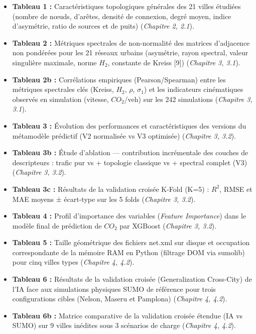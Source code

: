 \documentclass[10pt, a4paper]{article}
\providecommand{\tightlist}{}
\begin{document}
\begin{itemize}
\tightlist
\item
  \textbf{Tableau 1 :} Caractéristiques topologiques générales des 21
  villes étudiées (nombre de nœuds, d'arêtes, densité de connexion,
  degré moyen, indice d'asymétrie, ratio de sources et de puits)
  (\emph{Chapitre 2, 2.1}).
\item
  \textbf{Tableau 2 :} Métriques spectrales de non-normalité des
  matrices d'adjacence non pondérées pour les 21 réseaux urbains
  (asymétrie, rayon spectral, valeur singulière maximale, norme \(H_2\),
  constante de Kreiss {[}9{]}) (\emph{Chapitre 3, 3.1}).
\item
  \textbf{Tableau 2b :} Corrélations empiriques (Pearson/Spearman) entre
  les métriques spectrales clés (Kreiss, \(H_2\), \(\rho\),
  \(\sigma_1\)) et les indicateurs cinématiques observés en simulation
  (vitesse, \(CO_2\)/veh) sur les 242 simulations (\emph{Chapitre 3,
  3.1}).
\item
  \textbf{Tableau 3 :} Évolution des performances et caractéristiques
  des versions du métamodèle prédictif (V2 normalisée vs V3 optimisée)
  (\emph{Chapitre 3, 3.2}).
\item
  \textbf{Tableau 3b :} Étude d'ablation --- contribution incrémentale
  des couches de descripteurs : trafic pur vs + topologie classique vs +
  spectral complet (V3) (\emph{Chapitre 3, 3.2}).
\item
  \textbf{Tableau 3c :} Résultats de la validation croisée K-Fold (K=5)
  : \(R^2\), RMSE et MAE moyens ± écart-type sur les 5 folds
  (\emph{Chapitre 3, 3.2}).
\item
  \textbf{Tableau 4 :} Profil d'importance des variables (\emph{Feature
  Importance}) dans le modèle final de prédiction de \(CO_2\) par
  XGBoost (\emph{Chapitre 3, 3.2}).
\item
  \textbf{Tableau 5 :} Taille géométrique des fichiers net.xml sur
  disque et occupation correspondante de la mémoire RAM en Python
  (filtrage DOM via sumolib) pour cinq villes types (\emph{Chapitre 4,
  4.2}).
\item
  \textbf{Tableau 6 :} Résultats de la validation croisée
  (Generalization Cross-City) de l'IA face aux simulations physiques
  SUMO de référence pour trois configurations cibles (Nelson, Maseru et
  Pamplona) (\emph{Chapitre 4, 4.2}).
\item
  \textbf{Tableau 6b :} Matrice comparative de la validation croisée
  étendue (IA vs SUMO) sur 9 villes inédites sous 3 scénarios de charge
  (\emph{Chapitre 4, 4.2}).

\end{itemize}
\end{document}
